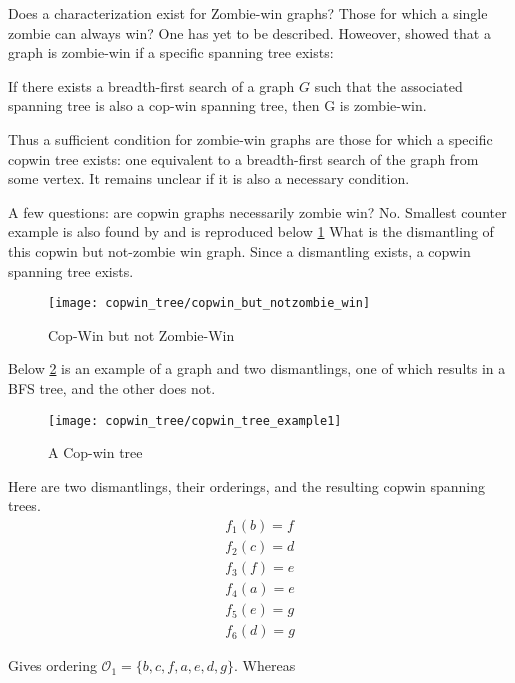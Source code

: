 Does a characterization exist for Zombie-win graphs? Those for which a single zombie
can always win? One has yet to be described. Howeover, \cite{fitzpatrick2016deterministic} showed that a graph is zombie-win if a specific spanning tree exists:

\begin{theorem}[Fitzpatrick] If there exists a breadth-first search of a graph $G$ such that the associated spanning tree is also a cop-win spanning tree, then G is zombie-win.
\end{theorem}

Thus a sufficient condition for zombie-win graphs are those for which a specific copwin tree exists: one equivalent to a breadth-first search of the graph from some vertex. It remains unclear if it is also a necessary condition.

A few questions: are copwin graphs necessarily zombie win? No. Smallest counter example is also
found by \cite{fitzpatrick2016deterministic} and is reproduced below \ref{fig:copwin_but_notzombie_win}
What is the dismantling of this copwin but not-zombie win graph. Since a dismantling exists,
a copwin spanning tree exists.

\begin{figure}
\centering
\texttt{[image: copwin\_tree/copwin\_but\_notzombie\_win]}
\caption{Cop-Win but not Zombie-Win \label{fig:copwin_but_notzombie_win}}
\end{figure}

Below \ref{fig:copwin_tree_example1} is an example of a graph and two dismantlings, one of which results in a BFS tree, and the other does not.

\begin{figure}
\centering
\texttt{[image: copwin\_tree/copwin\_tree\_example1]}
\caption{A Cop-win tree \label{fig:copwin_tree_example1}}
\end{figure}

Here are two dismantlings, their orderings, and the resulting copwin spanning trees.
\begin{align*}
  f_1(b) = f \\
  f_2(c) = d \\
  f_3(f) = e \\
  f_4(a) = e \\
  f_5(e) = g \\
  f_6(d) = g
\end{align*}

Gives ordering $\mathcal{O}_1 = \{ b, c, f, a, e, d, g \}$. Whereas

